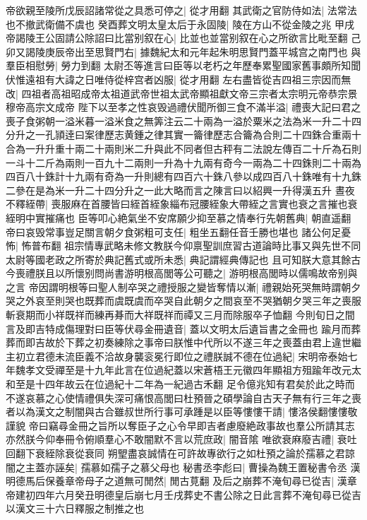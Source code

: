 帝欲親至陵所戊辰詔諸常從之具悉可停之|{
	從才用翻}
其武衛之官防侍如法|{
	法常法也不撤武衛備不虞也}
癸酉葬文明太皇太后于永固陵|{
	陵在方山不從金陵之兆}
甲戌帝謁陵王公固請公除詔曰比當别叙在心|{
	比並也並當别叙在心之所欲言比毗至翻}
己卯又謁陵庚辰帝出至思賢門右|{
	據魏紀太和元年起朱明思賢門蓋平城宫之南門也}
與羣臣相慰勞|{
	勞力到翻}
太尉丕等進言曰臣等以老朽之年歷奉累聖國家舊事頗所知聞伏惟遠祖有大諱之日唯侍從梓宫者凶服|{
	從才用翻}
左右盡皆從吉四祖三宗因而無改|{
	四祖者高祖昭成帝太祖道武帝世祖太武帝顯祖獻文帝三宗者太宗明元帝恭宗景穆帝高宗文成帝}
陛下以至孝之性哀毁過禮伏聞所御三食不滿半溢|{
	禮喪大記曰君之喪子食粥朝一溢米暮一溢米食之無筭注云二十兩為一溢於粟米之法為米一升二十四分升之一孔頴逹曰案律歷志黄鍾之律其實一籥律歷志合籥為合則二十四銖合重兩十合為一升升重十兩二十兩則米二升與此不同者但古秤有二法說左傳百二十斤為石則一斗十二斤為兩則一百九十二兩則一升為十九兩有奇今一兩為二十四銖則二十兩為四百八十銖計十九兩有奇為一升則總有四百六十銖八參以成四百八十銖唯有十九銖二參在是為米一升二十四分升之一此大略而言之陳言曰以紹興一升得漢五升}
晝夜不釋絰帶|{
	喪服麻在首腰皆曰絰首絰象緇布冠腰絰象大帶絰之言實也衰之言摧也衰絰明中實摧痛也}
臣等叩心絶氣坐不安席願少抑至慕之情奉行先朝舊典|{
	朝直遥翻}
帝曰哀毁常事豈足關言朝夕食粥粗可支任|{
	粗坐五翻任音壬勝也堪也}
諸公何足憂怖|{
	怖普布翻}
祖宗情專武略未修文教朕今仰禀聖訓庶習古道論時比事又與先世不同太尉等國老政之所寄於典記舊式或所未悉|{
	典記謂經典傳記也}
且可知朕大意其餘古今喪禮朕且以所懷别問尚書游明根高閭等公可聽之|{
	游明根高閭時以儒鳴故帝别與之言}
帝因謂明根等曰聖人制卒哭之禮授服之變皆奪情以漸|{
	禮親始死哭無時謂朝夕哭之外哀至則哭也既葬而虞既虞而卒哭自此朝夕之間哀至不哭猶朝夕哭三年之喪服斬衰期而小祥既祥而練再朞而大祥既祥而禫又三月而除服卒子恤翻}
今則旬日之間言及即吉特成傷理對曰臣等伏尋金冊遺音|{
	蓋以文明太后遺旨書之金冊也}
踰月而葬葬而即吉故於下葬之初奏練除之事帝曰朕惟中代所以不遂三年之喪蓋由君上違世繼主初立君德未流臣義不洽故身襲衮冕行即位之禮朕誠不德在位過紀|{
	宋明帝泰始七年魏孝文受禪至是十九年此言在位過紀蓋以宋蒼梧王元徽四年顯祖方殂踰年改元太和至是十四年故云在位過紀十二年為一紀過古禾翻}
足令億兆知有君矣於此之時而不遂哀慕之心使情禮俱失深可痛恨高閭曰杜預晉之碩學論自古天子無有行三年之喪者以為漢文之制闇與古合雖叔世所行事可承踵是以臣等慺慺干請|{
	慺洛侯翻慺慺敬謹貌}
帝曰竊尋金冊之旨所以奪臣子之心令早即吉者慮廢絶政事故也羣公所請其志亦然朕今仰奉冊令俯順羣心不敢闇默不言以荒庶政|{
	闇音隂}
唯欲衰麻廢吉禮|{
	衰吐回翻下衰絰除衰從衰同}
朔朢盡哀誠情在可許故專欲行之如杜預之論於孺慕之君諒闇之主蓋亦誣矣|{
	孺慕如孺子之慕父母也}
秘書丞李彪曰|{
	曹操為魏王置秘書令丞}
漢明德馬后保養章帝母子之道無可閒然|{
	閒古莧翻}
及后之崩葬不淹旬尋已從吉|{
	漢章帝建初四年六月癸丑明德皇后崩七月壬戌葬史不書公除之日此言葬不淹旬尋已從吉以漢文三十六日釋服之制推之也}
